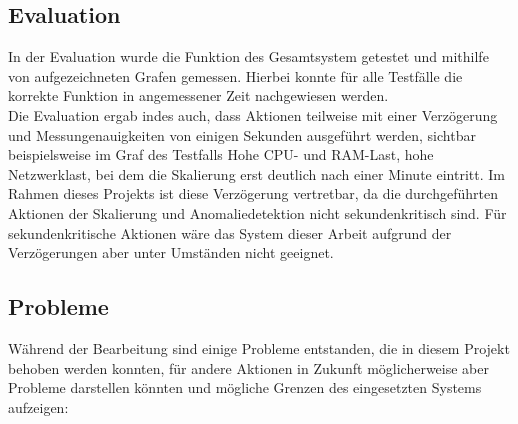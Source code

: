 \documentclass[a4paper,10pt]{scrartcl}
\begin{document}
\subsection{Evaluation}

In der Evaluation wurde die Funktion des Gesamtsystem getestet und mithilfe von aufgezeichneten Grafen gemessen. Hierbei konnte für alle Testfälle die korrekte Funktion in angemessener Zeit nachgewiesen werden.\\
Die Evaluation ergab indes auch, dass Aktionen teilweise mit einer Verzögerung und Messungenauigkeiten von einigen Sekunden ausgeführt werden, sichtbar beispielsweise im Graf des Testfalls \glqq Hohe CPU- und RAM-Last, hohe Netzwerklast\grqq , bei dem die Skalierung erst deutlich nach einer Minute eintritt. Im Rahmen dieses Projekts ist diese Verzögerung vertretbar, da die durchgeführten Aktionen der Skalierung und Anomaliedetektion nicht sekundenkritisch sind. Für sekundenkritische Aktionen wäre das System dieser Arbeit aufgrund der Verzögerungen aber unter Umständen nicht geeignet.\\


\subsection{Probleme}

Während der Bearbeitung sind einige Probleme entstanden, die in diesem Projekt behoben werden konnten, für andere Aktionen in Zukunft möglicherweise aber Probleme darstellen könnten und mögliche Grenzen des eingesetzten Systems aufzeigen:\\
\end{document}
